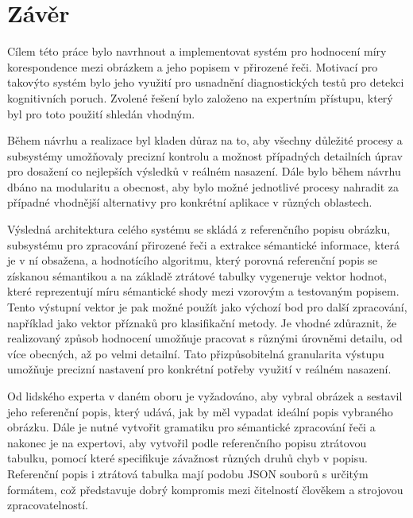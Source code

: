 \section{Závěr}
Cílem této práce bylo navrhnout a implementovat systém pro hodnocení míry korespondence mezi
obrázkem a jeho popisem v přirozené řeči.
Motivací pro takovýto systém bylo jeho využití pro usnadnění diagnostických testů pro detekci kognitivních poruch.
Zvolené řešení bylo založeno na expertním přístupu, který byl pro toto použití shledán vhodným.

Během návrhu a realizace byl kladen důraz na to, aby všechny důležité procesy a subsystémy umožňovaly
precizní kontrolu a možnost případných detailních úprav pro dosažení co nejlepších výsledků v reálném nasazení.
Dále bylo během návrhu dbáno na modularitu a obecnost, aby bylo možné jednotlivé procesy nahradit
za případné vhodnější alternativy pro konkrétní aplikace v různých oblastech.

Výsledná architektura celého systému se skládá z referenčního popisu obrázku, subsystému pro zpracování přirozené
řeči a extrakce sémantické informace, která je v ní obsažena, a hodnotícího algoritmu,
který porovná referenční popis se získanou sémantikou a na základě ztrátové tabulky vygeneruje
vektor hodnot, které reprezentují míru sémantické shody mezi vzorovým a testovaným popisem.
Tento výstupní vektor je pak možné použít jako výchozí bod pro další zpracování, například jako vektor příznaků pro klasifikační metody.
Je vhodné zdůraznit, že realizovaný způsob hodnocení umožňuje pracovat s různými úrovněmi detailu, od více obecných, až po velmi detailní.
Tato přizpůsobitelná granularita výstupu umožňuje precizní nastavení pro konkrétní potřeby využití v reálném nasazení.

Od lidského experta v daném oboru je vyžadováno, aby vybral obrázek a sestavil jeho referenční popis, který udává,
jak by měl vypadat ideální popis vybraného obrázku.
Dále je nutné vytvořit gramatiku pro sémantické zpracování řeči a nakonec je na expertovi, aby vytvořil podle referenčního popisu
ztrátovou tabulku, pomocí které specifikuje závažnost různých druhů chyb v popisu.
Referenční popis i ztrátová tabulka mají podobu JSON souborů s určitým formátem, což představuje dobrý kompromis mezi čitelností člověkem a strojovou zpracovatelností.

